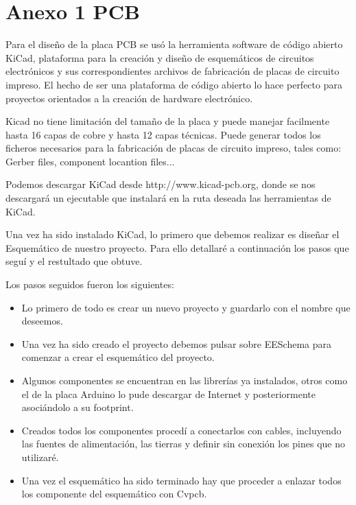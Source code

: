 	\chapter*{Anexo 1 PCB} %
	
		Para el dise\~no de la placa PCB se usó la herramienta software de código abierto KiCad, plataforma para la creación y dise\~no de esquemáticos de circuitos electrónicos y sus correspondientes archivos de fabricación de placas de circuito impreso. El hecho de ser una plataforma de código abierto lo hace perfecto para proyectos orientados a la creación de hardware electrónico.
		
		Kicad no tiene limitación del tama\~no de la placa y puede manejar facilmente hasta 16 capas de cobre y hasta 12 capas técnicas. Puede generar todos los ficheros necesarios para la fabricación de placas de circuito impreso, tales como: Gerber files, component locantion files...
		
		Podemos descargar KiCad desde http://www.kicad-pcb.org, donde se nos descargará un ejecutable que instalará en la ruta deseada las herramientas de KiCad.
		
		Una vez ha sido instalado KiCad, lo primero que debemos realizar es dise\~nar el Esquemático de nuestro proyecto. Para ello detallaré a continuación los pasos que seguí y el restultado que obtuve.
		
		Los pasos seguidos fueron los siguientes:
		
		\begin{itemize}	
			
			\item Lo primero de todo es crear un nuevo proyecto y guardarlo con el nombre que deseemos.
			
			\item Una vez ha sido creado el proyecto debemos pulsar sobre EESchema para comenzar a crear el esquemático del proyecto.
			
			\item Algunos componentes se encuentran en las librerías ya instalados, otros como el de la placa Arduino lo pude descargar de Internet y posteriormente asociándolo a su footprint.
			
			\item Creados todos los componentes procedí a conectarlos con cables, incluyendo las fuentes de alimentación, las tierras y definir sin conexión los pines que no utilizaré.
			
			\item Una vez el esquemático ha sido terminado hay que proceder a enlazar todos los componente del esquemático con Cvpcb.
			
		\end{itemize}
		
